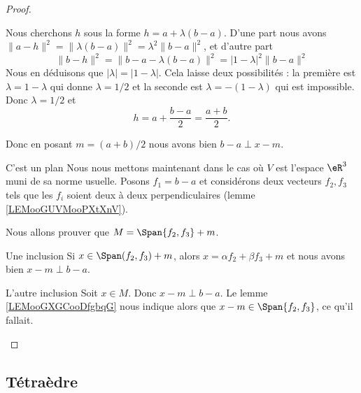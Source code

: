 \begin{proof}
\begin{subproof}
            Nous cherchons \( h\) sous la forme \( h=a+\lambda(b-a)\). D'une part nous avons \( \| a-h \|^2=\| \lambda(b-a) \|^2=\lambda^2\| b-a \|^2\), et d'autre part
            \begin{equation}
                \| b-h \|^2=\| b-a-\lambda(b-a) \|^2=| 1-\lambda |^2\| b-a \|^2
            \end{equation}
            Nous en déduisons que \( | \lambda |=| 1-\lambda |\). Cela laisse deux possibilités : la première est \( \lambda=1-\lambda\) qui donne \( \lambda=1/2\) et la seconde est \( \lambda=-(1-\lambda)\) qui est impossible. Donc \( \lambda=1/2\) et
            \begin{equation}
                h=a+\frac{ b-a }{ 2 }=\frac{ a+b }{ 2 }.
            \end{equation}
            
            Donc en posant \( m=(a+b)/2\) nous avons bien \( b-a\perp x-m\).
        \item[C'est un plan]
            Nous nous mettons maintenant dans le cas où \( V\) est l'espace \( \eR^3\) muni de sa norme usuelle. Posons \( f_1=b-a\) et considérons deux vecteurs \( f_2,f_3\) tels que les \( f_i\) soient deux à deux perpendiculaires (lemme \ref{LEMooGUVMooPXtXnV}).

            Nous allons prouver que \( M=\Span\{ f_2,f_3 \}+m\).

            \begin{subproof}
                \item[Une inclusion]
                    Si \( x\in \Span(f_2,f_3)+m\), alors \( x=\alpha f_2+\beta f_3+m\) et nous avons bien \( x-m\perp b-a\).
                \item[L'autre inclusion]
                    Soit \( x\in M\). Donc \( x-m\perp b-a\). Le lemme \ref{LEMooGXGCooDfgbqG} nous indique alors que \( x-m\in\Span\{ f_2,f_3 \}\), ce qu'il fallait.
            \end{subproof}
    \end{subproof}
\end{proof}


\subsection{Tétraèdre}

